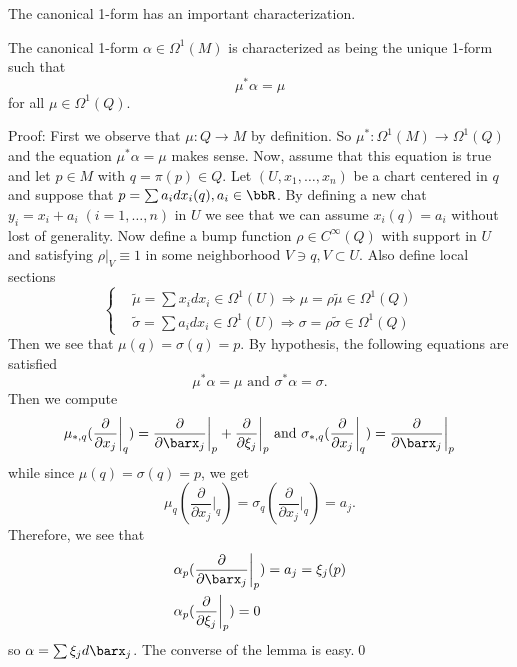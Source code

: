The canonical 1-form has an important characterization.
\begin{dang}
    \begin{lemma}
        The canonical 1-form $\alpha\in\Omega^1(M)$ is characterized as being the unique 1-form such that 
        \begin{equation}
            \mu^*\alpha = \mu 
        \end{equation}
        for all $\mu\in \Omega^1(Q)$.
    \end{lemma}
\end{dang}
Proof: First we observe that $\mu: Q\to M$ by definition. So $\mu^*:\Omega^1(M)\to\Omega^1(Q)$ and the equation 
$\mu^*\alpha = \mu$ makes sense. Now, assume that this equation is true and let $p\in M$ with $q=\pi(p)\in Q$. Let 
$(U,x_1,\dots, x_n)$ be a chart centered in $q$ and suppose that $p=\sum a_idx_i(q),a_i\in\bbR$. By defining a new chat 
$y_i=x_i+a_i\;(i=1,\dots,n)$ in $U$ we see that we can assume $x_i(q)=a_i$ without lost of generality. Now 
define a bump function $\rho\in C^\infty(Q)$ with support in $U$ and satisfying 
$\rho|_V\equiv 1$ in some neighborhood $V\ni q,V\subset U$. Also define local sections 
\begin{equation}
    \left\{\begin{aligned}
        &\widetilde{\mu}=\sum x_idx_i\in\Omega^1(U)\Rightarrow \mu=\rho\widetilde{\mu}\in\Omega^1(Q)\\
        &\widetilde{\sigma}=\sum a_idx_i\in\Omega^1(U)\Rightarrow \sigma=\rho\widetilde{\sigma}\in\Omega^1(Q)
    \end{aligned}\right.
\end{equation}
Then we see that $\mu(q)=\sigma(q)=p$. By hypothesis, the following equations are satisfied
\begin{equation}
    \mu^*\alpha=\mu\text{ and }\sigma^*\alpha = \sigma.
\end{equation}
Then we compute
\begin{equation}
    \mu_{*,q}(\frac{\partial}{\partial x_j}\bigg|_q)
    =\frac{\partial}{\partial\barx_j}\bigg|_p+\frac{\partial}{\partial\xi_j}\bigg|_p 
    \text{ and }
    \sigma_{*,q}(\frac{\partial}{\partial x_j}\bigg|_q)=\frac{\partial}{\partial\barx_j}\bigg|_p
\end{equation}
while since $\mu(q)=\sigma(q)=p$, we get 
\begin{equation}
    \mu_q(\frac{\partial}{\partial x_j}\bigg|_q)=\sigma_q(\frac{\partial}{\partial x_j}\bigg|_q)=a_j.
\end{equation}
Therefore, we see that 
\begin{equation}
    \begin{aligned}
        &\alpha_p(\frac{\partial}{\partial\barx_j}\bigg|_p)=a_j=\xi_j(p)\\
        &\alpha_p(\frac{\partial}{\partial\xi_j}\bigg|_p)=0
    \end{aligned}
\end{equation}
so $\alpha = \sum \xi_jd\barx_j$. The converse of the lemma is easy.\qed 

